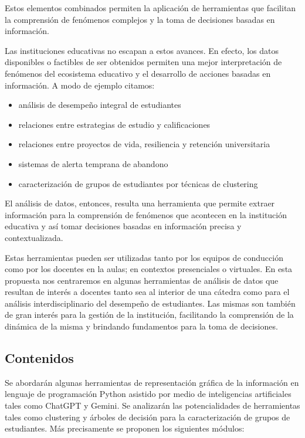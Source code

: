 Estos elementos combinados permiten la aplicación de herramientas que facilitan la comprensión de fenómenos complejos y la toma de decisiones basadas en información.

Las instituciones educativas no escapan a estos avances. En efecto, los datos disponibles o factibles de ser obtenidos permiten una mejor interpretación de fenómenos del ecosistema educativo y el desarrollo de acciones basadas en información. A modo de ejemplo citamos:

\begin{itemize}
	\item análisis de desempeño integral de estudiantes
	\item relaciones entre estrategias de estudio y calificaciones
	\item relaciones entre proyectos de vida, resiliencia y retención universitaria
	\item sistemas de alerta temprana de abandono
	\item caracterización de grupos de estudiantes por técnicas de clustering
\end{itemize}

El análisis de datos, entonces, resulta una herramienta que permite extraer información para la comprensión de fenómenos que acontecen en la institución educativa y así tomar decisiones basadas en información precisa y contextualizada.

Estas herramientas pueden ser utilizadas tanto por los equipos de conducción como por los docentes en la aulas; en contextos presenciales o virtuales. En esta propuesta nos centraremos en algunas herramientas de análisis de datos que resultan de interés a docentes tanto sea al interior de una cátedra como para el análisis interdisciplinario del desempeño de estudiantes. Las mismas son también de gran interés para la gestión de la institución, facilitando la comprensión de la dinámica de la misma y brindando fundamentos para la toma de decisiones.

\subsection{Contenidos}

Se abordarán algunas herramientas de representación gráfica de la información en lenguaje de programación Python asistido por medio de inteligencias artificiales tales como ChatGPT y Gemini. Se analizarán las potencialidades de herramientas tales como clustering y árboles de decisión para la caracterización de grupos de estudiantes. Más precisamente se proponen los siguientes módulos:

